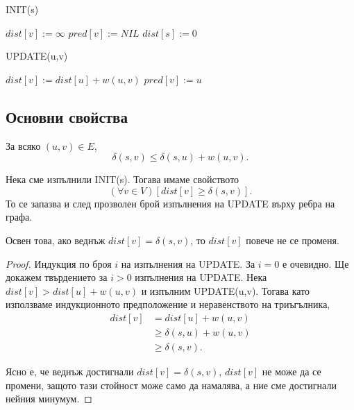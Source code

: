 \begin{algorithm}
  \caption{INIT(s)}
  \label{alg:init}
  \begin{algorithmic}[1]
    \STATE $dist[v] := \infty$
    \STATE $pred[v] := NIL$
    \ENDFOR
    \STATE $dist[s] := 0$
  \end{algorithmic}
\end{algorithm}

\begin{algorithm}
  \caption{UPDATE(u,v)}
  \label{alg:update}
  \begin{algorithmic}[1]
    \STATE $dist[v] := dist[u] + w(u,v)$
    \STATE $pred[v] := u$
    \ENDIF
  \end{algorithmic}
\end{algorithm}

\subsection{Основни свойства}
  
\begin{prop}
  \label{prop:triangle}
  За всяко $(u,v) \in E$,
  \[\delta(s,v) \leq \delta(s,u) + w(u,v).\]
\end{prop}

\begin{prop}
  \label{prop:upper-bound}
  Нека сме изпълнили INIT(s).
  Тогава имаме свойството \[(\forall v\in V)[dist[v] \geq \delta(s,v)].\]
  То се запазва и след прозволен брой изпълнения на UPDATE върху ребра на графа.
  
  Освен това, ако веднъж $dist[v] = \delta(s,v)$, то $dist[v]$
  повече не се променя.
\end{prop}
\begin{proof}
  Индукция по броя $i$ на изпълнения на UPDATE.
  За $i = 0$ е очевидно.
  Ще докажем твърдението за $i > 0$ изпълнения на UPDATE.
  Нека $dist[v] > dist[u] + w(u,v)$ и изпълним UPDATE(u,v).
  Тогава като използваме индукционното предположение и неравенството на триъгълника,
  \begin{align*}
    dist[v] & = dist[u] + w(u,v)\\
    & \geq \delta(s,u) + w(u,v)\\
    & \geq  \delta(s,v).
  \end{align*}

  Ясно е, че веднъж достигнали $dist[v] = \delta(s,v)$, $dist[v]$
  не може да се промени, защото тази стойност може само да намалява, а ние
  сме достигнали нейния минумум.
\end{proof}

